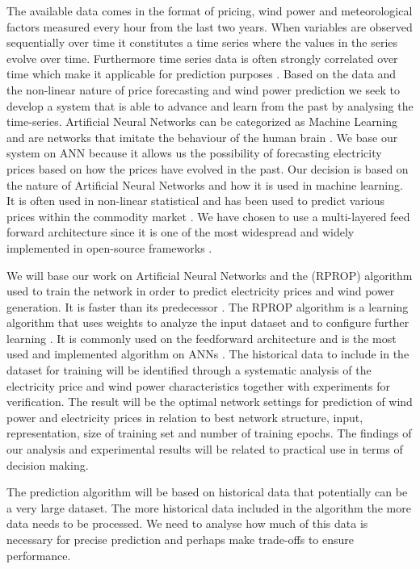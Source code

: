 The available data comes in the format of pricing, wind power and meteorological factors measured every hour from the last two years. When variables are observed sequentially over time it constitutes a time series where the values in the series evolve over time. Furthermore time series data is often strongly correlated over time which make it applicable for prediction purposes \cite[Chapter~7.1.2]{econometrics}. Based on the data and the non-linear nature of price forecasting and wind power prediction we seek to develop a system that is able to advance and learn from the past by analysing the time-series. Artificial Neural Networks can be categorized as Machine Learning \cite{18} and are networks that imitate the behaviour of the human brain \cite{1}. We base our system on ANN because it allows us the possibility of forecasting electricity prices based on how the prices have evolved in the past. Our decision is based on the nature of Artificial Neural Networks and how it is used in machine learning. It is often used in non-linear statistical  and has been used to predict various prices within the commodity market \cite{2,3,stockForecasting,pjmForecast}. We have chosen to use a multi-layered feed forward architecture since it is one of the most widespread and widely implemented in open-source frameworks \cite{17}.

We will base our work on Artificial Neural Networks and the  (RPROP) algorithm used to train the network in order to predict electricity prices and wind power generation. It is faster than its predecessor  \cite{15}. The RPROP algorithm is a learning algorithm that uses weights to analyze the input dataset and to configure further learning \cite{17}. It is commonly used on the feedforward architecture and is the most used and implemented algorithm on ANNs \cite{17}. The historical data to include in the dataset for training will be identified through a systematic analysis of the electricity price and wind power characteristics together with experiments for verification. The result will be the optimal network settings for prediction of wind power and electricity prices in relation to best network structure, input, representation, size of training set and number of training epochs. The findings of our analysis and experimental results will be related to practical use in terms of decision making. 

The prediction algorithm will be based on historical data that potentially can be a very large dataset. The more historical data included in the algorithm the more data needs to be processed. We need to analyse how much of this data is necessary for precise prediction and perhaps make trade-offs to ensure performance.